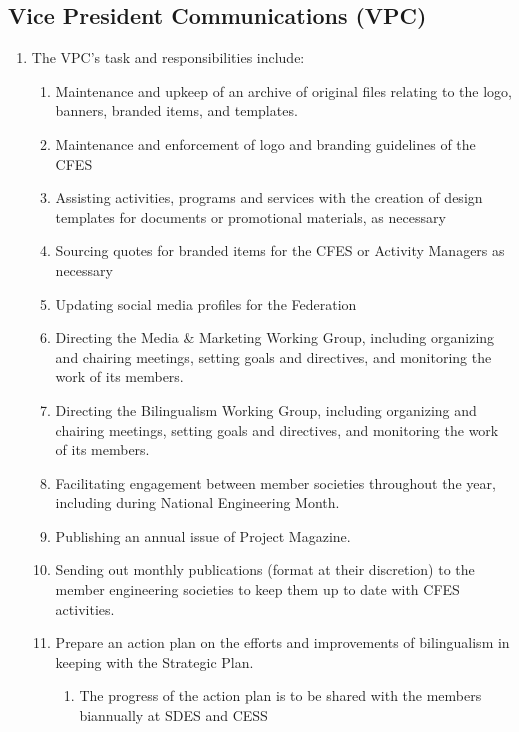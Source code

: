 \subsection{Vice President Communications (VPC)}
\label{vice-president-communications-vpc}

\begin{enumerate}
 \item
  The VPC's task and responsibilities include:

  \begin{enumerate}
   \item
    Maintenance and upkeep of an archive of original files relating to the logo, banners, branded items, and templates.
   \item
    Maintenance and enforcement of logo and branding guidelines of the CFES
   \item
    Assisting activities, programs and services with the creation of design templates for documents or promotional materials, as necessary
   \item
    Sourcing quotes for branded items for the CFES or Activity Managers as necessary
   \item
    Updating social media profiles for the Federation
   \item
    Directing the Media \& Marketing Working Group, including organizing and chairing meetings, setting goals and directives, and monitoring the work of its members.
   \item
    Directing the Bilingualism Working Group, including organizing and chairing meetings, setting goals and directives, and monitoring the work of its members.
   \item
    Facilitating engagement between member societies throughout the year, including during National Engineering Month.
   \item
    Publishing an annual issue of Project Magazine.
   \item
    Sending out monthly publications (format at their discretion) to the member engineering societies to keep them up to date with CFES activities.
   \item
    Prepare an action plan on the efforts and improvements of bilingualism in keeping with the Strategic Plan.

    \begin{enumerate}
     \item
      The progress of the action plan is to be shared with the members biannually at SDES and CESS

    \end{enumerate}
  \end{enumerate}
\end{enumerate}


